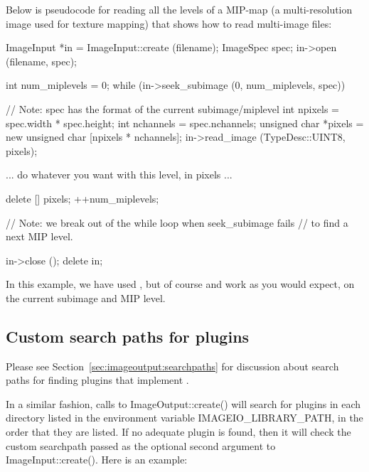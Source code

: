 Below is pseudocode for reading all the levels of a MIP-map (a
multi-resolution image used for texture mapping) that shows how to read
multi-image files:

\begin{code}
        ImageInput *in = ImageInput::create (filename);
        ImageSpec spec;
        in->open (filename, spec);

        int num_miplevels = 0;
        while (in->seek_subimage (0, num_miplevels, spec)) {
            // Note: spec has the format of the current subimage/miplevel
            int npixels = spec.width * spec.height;
            int nchannels = spec.nchannels;
            unsigned char *pixels = new unsigned char [npixels * nchannels];
            in->read_image (TypeDesc::UINT8, pixels);

            ... do whatever you want with this level, in pixels ...

            delete [] pixels;
            ++num_miplevels;
        }
        // Note: we break out of the while loop when seek_subimage fails
        // to find a next MIP level.

        in->close ();
        delete in;
\end{code}

In this example, we have used \readimage, but of course \readscanline
and \readtile work as you would expect, on the current subimage and MIP
level.


\subsection{Custom search paths for plugins}
\label{sec:imageinput:searchpaths}

Please see Section~\ref{sec:imageoutput:searchpaths} for discussion
about search paths for finding plugins that implement \ImageOutput.

In a similar fashion, calls to {\cf ImageOutput::create()}
will search for plugins in each directory listed in the environment
variable {\cf IMAGEIO_LIBRARY_PATH}, in the order that they are listed.
If no adequate plugin is found, then it will check the custom searchpath
passed as the optional second argument to {\cf ImageInput::create()}.
Here is an example:



